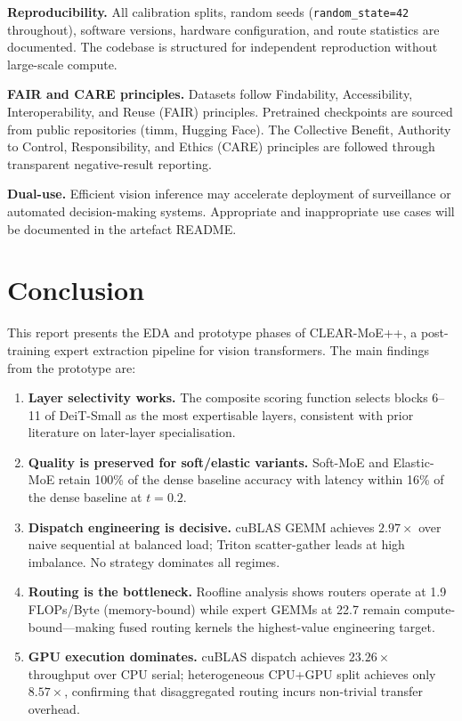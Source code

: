 \documentclass[12pt,a4paper]{article}
\begin{document}
\textbf{Reproducibility.} All calibration splits, random seeds (\texttt{random\_state=42} throughout), software versions, hardware configuration, and route statistics are documented. The codebase is structured for independent reproduction without large-scale compute.

\textbf{FAIR and CARE principles.} Datasets follow Findability, Accessibility, Interoperability, and Reuse (FAIR) principles. Pretrained checkpoints are sourced from public repositories (timm, Hugging Face). The Collective Benefit, Authority to Control, Responsibility, and Ethics (CARE) principles are followed through transparent negative-result reporting.

\textbf{Dual-use.} Efficient vision inference may accelerate deployment of surveillance or automated decision-making systems. Appropriate and inappropriate use cases will be documented in the artefact README.

\section{Conclusion}
\label{sec:conclusion}

This report presents the EDA and prototype phases of CLEAR-MoE++, a post-training expert extraction pipeline for vision transformers. The main findings from the prototype are:

\begin{enumerate}
\item \textbf{Layer selectivity works.} The composite scoring function selects blocks 6--11 of DeiT-Small as the most expertisable layers, consistent with prior literature on later-layer specialisation.

\item \textbf{Quality is preserved for soft/elastic variants.} Soft-MoE and Elastic-MoE retain 100\% of the dense baseline accuracy with latency within 16\% of the dense baseline at $t=0.2$.

\item \textbf{Dispatch engineering is decisive.} cuBLAS GEMM achieves $2.97\times$ over naive sequential at balanced load; Triton scatter-gather leads at high imbalance. No strategy dominates all regimes.

\item \textbf{Routing is the bottleneck.} Roofline analysis shows routers operate at 1.9 FLOPs/Byte (memory-bound) while expert GEMMs at 22.7 remain compute-bound—making fused routing kernels the highest-value engineering target.

\item \textbf{GPU execution dominates.} cuBLAS dispatch achieves $23.26\times$ throughput over CPU serial; heterogeneous CPU+GPU split achieves only $8.57\times$, confirming that disaggregated routing incurs non-trivial transfer overhead.
\end{enumerate}
\end{document}
